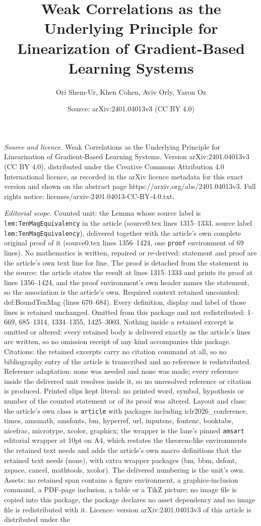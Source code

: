 \documentclass[10pt,a4paper]{amsart}
\title[Weak Correlations as the Underlying Principle for Linearizat]{Weak Correlations as the Underlying Principle for Linearization of Gradient-Based Learning Systems}
\author{Ori Shem-Ur, Khen Cohen, Aviv Orly, Yaron Oz}
\date{Source: arXiv:2401.04013v3 (CC BY 4.0)}
\begin{document}
\maketitle

\noindent\emph{Source and licence.} Weak Correlations as the Underlying Principle for Linearization of Gradient-Based Learning Systems. Version arXiv:2401.04013v3 (CC BY 4.0), distributed under the Creative Commons Attribution 4.0 International licence, as recorded in the arXiv licence metadata for this exact version and shown on the abstract page https://arxiv.org/abs/2401.04013v3. Full rights notice: licenses/arxiv-2401.04013-CC-BY-4.0.txt.\par\smallskip

\noindent\textit{Editorial scope.} Counted unit: the Lemma whose source label is \texttt{lem:TenMagEquivalency} in the article (source0.tex lines 1315--1333, source label \texttt{lem:TenMagEquivalency}), delivered together with the article's own complete original proof of it (source0.tex lines 1356--1424, one \texttt{proof} environment of 69 lines). No mathematics is written, repaired or re-derived: statement and proof are the article's own text line for line. The proof is detached from the statement in the source: the article states the result at lines 1315--1333 and prints its proof at lines 1356--1424, and the proof environment's own header names the statement, so the association is the article's own. Required context retained uncounted: def:BoundTenMag (lines 670--684). Every definition, display and label of those lines is retained unchanged. Omitted from this package and not redistributed: 1--669, 685--1314, 1334--1355, 1425--3003. Nothing inside a retained excerpt is omitted or altered: every retained body is delivered exactly as the article's lines are written, so no omission receipt of any kind accompanies this package. Citations: the retained excerpts carry no citation command at all, so no bibliography entry of the article is transcribed and no reference is redistributed. Reference adaptation: none was needed and none was made; every reference inside the delivered unit resolves inside it, so no unresolved reference or citation is produced. Printed slips kept literal: no printed word, symbol, hypothesis or number of the counted statement or of its proof was altered. Layout and class: the article's own class is \texttt{article} with packages including iclr2026\_conference, times, amsmath, amsfonts, bm, hyperref, url, inputenc, fontenc, booktabs, nicefrac, microtype, xcolor, graphicx; the wrapper is the lane's pinned \texttt{amsart} editorial wrapper at 10pt on A4, which restates the theorem-like environments the retained text needs and adds the article's own macro definitions that the retained text needs (none), with extra wrapper packages (bm, bbm, dsfont, xspace, cancel, mathtools, xcolor). The delivered numbering is the unit's own. Assets: no retained span contains a figure environment, a graphics-inclusion command, a PDF-page inclusion, a table or a TikZ picture; no image file is copied into this package, the package declares no asset dependency and no image file is redistributed with it. Licence: version arXiv:2401.04013v3 of this article is distributed under the 
\end{document}

